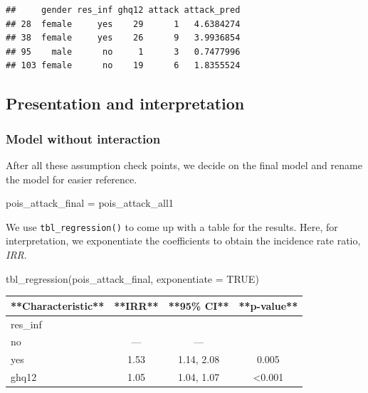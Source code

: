 \documentclass[
  10pt,
]{krantz}
\newenvironment{Shaded}{\begin{snugshade}}{\end{snugshade}}
\newcommand{\AttributeTok}[1]{\textcolor[rgb]{0.77,0.63,0.00}{#1}}
\newcommand{\ConstantTok}[1]{\textcolor[rgb]{0.00,0.00,0.00}{#1}}
\newcommand{\FunctionTok}[1]{\textcolor[rgb]{0.00,0.00,0.00}{#1}}
\newcommand{\NormalTok}[1]{#1}
\newcommand{\OtherTok}[1]{\textcolor[rgb]{0.56,0.35,0.01}{#1}}
\begin{document}
\begin{verbatim}
##     gender res_inf ghq12 attack attack_pred
## 28  female     yes    29      1   4.6384274
## 38  female     yes    26      9   3.9936854
## 95    male      no     1      3   0.7477996
## 103 female      no    19      6   1.8355524
\end{verbatim}

\hypertarget{presentation-and-interpretation-2}{%
\subsection{Presentation and interpretation}\label{presentation-and-interpretation-2}}

\hypertarget{model-without-interaction}{%
\subsubsection*{\texorpdfstring{Model without interaction}{Model without interaction}}\label{model-without-interaction}}


After all these assumption check points, we decide on the final model and rename the model for easier reference.

\begin{Shaded}
\begin{Highlighting}[]
\NormalTok{pois\_attack\_final }\OtherTok{=}\NormalTok{ pois\_attack\_all1}
\end{Highlighting}
\end{Shaded}

We use \texttt{tbl\_regression()} to come up with a table for the results. Here, for interpretation, we exponentiate the coefficients to obtain the incidence rate ratio, \emph{IRR}.

\begin{Shaded}
\begin{Highlighting}[]
\FunctionTok{tbl\_regression}\NormalTok{(pois\_attack\_final, }\AttributeTok{exponentiate =} \ConstantTok{TRUE}\NormalTok{)}
\end{Highlighting}
\end{Shaded}

\begin{tabular}{l|c|c|c}
\hline
**Characteristic** & **IRR** & **95\% CI** & **p-value**\\
\hline
res\_inf &  &  & \\
\hline
no & — & — & \\
\hline
yes & 1.53 & 1.14, 2.08 & 0.005\\
\hline
ghq12 & 1.05 & 1.04, 1.07 & <0.001\\
\hline
\end{tabular}
\end{document}
